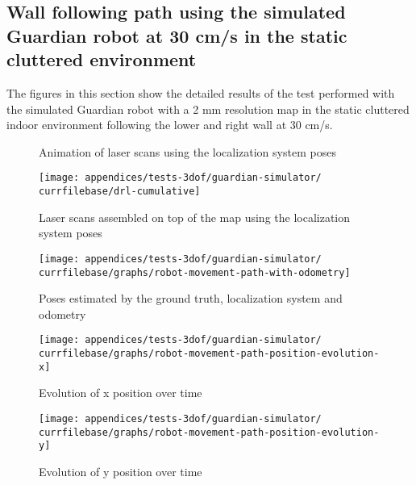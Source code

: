 \subsection{Wall following path using the simulated Guardian robot at 30 cm/s in the static cluttered environment}\label{subsec:appendix-a_guardian-simulator-tests_wall-following-path-using-the-simulated-guardian-robot-at-30-cm-s-in-static-cluttered-environment}

The figures in this section show the detailed results of the test performed with the simulated Guardian robot with a 2 mm resolution map in the static cluttered indoor environment following the lower and right wall at 30 cm/s.


\begin{figure}[H]
	\centering
	\caption{Animation of laser scans using the localization system poses}
\end{figure}


\begin{figure}[H]
	\centering
	\texttt{[image: appendices/tests-3dof/guardian-simulator/\\currfilebase/drl-cumulative]}
	\caption{Laser scans assembled on top of the map using the localization system poses}
\end{figure}


\begin{figure}[H]
	\centering
	\texttt{[image: appendices/tests-3dof/guardian-simulator/\\currfilebase/graphs/robot-movement-path-with-odometry]}
	\caption{Poses estimated by the ground truth, localization system and odometry}
\end{figure}

\begin{figure}[H]
	\centering
	\texttt{[image: appendices/tests-3dof/guardian-simulator/\\currfilebase/graphs/robot-movement-path-position-evolution-x]}
	\caption{Evolution of x position over time}
\end{figure}

\begin{figure}[H]
	\centering
	\texttt{[image: appendices/tests-3dof/guardian-simulator/\\currfilebase/graphs/robot-movement-path-position-evolution-y]}
	\caption{Evolution of y position over time}
\end{figure}


